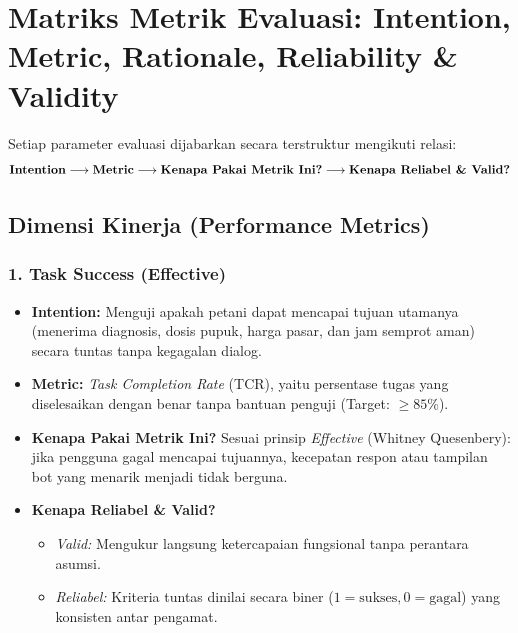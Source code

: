 \documentclass[11pt,a4paper]{article}
\begin{document}
\section{Matriks Metrik Evaluasi: Intention, Metric, Rationale, Reliability \& Validity}

Setiap parameter evaluasi dijabarkan secara terstruktur mengikuti relasi:
\begin{equation*}
    \text{\textbf{Intention}} \longrightarrow \text{\textbf{Metric}} \longrightarrow \text{\textbf{Kenapa Pakai Metrik Ini?}} \longrightarrow \text{\textbf{Kenapa Reliabel \& Valid?}}
\end{equation*}

\subsection{Dimensi Kinerja (Performance Metrics)}

\subsubsection{1. Task Success (Effective)}
\begin{itemize}[noitemsep]
    \item \textbf{Intention:} Menguji apakah petani dapat mencapai tujuan utamanya (menerima diagnosis, dosis pupuk, harga pasar, dan jam semprot aman) secara tuntas tanpa kegagalan dialog.
    \item \textbf{Metric:} \textit{Task Completion Rate} (TCR), yaitu persentase tugas yang diselesaikan dengan benar tanpa bantuan penguji (Target: $\ge 85\%$).
    \item \textbf{Kenapa Pakai Metrik Ini?} Sesuai prinsip \textit{Effective} (Whitney Quesenbery): jika pengguna gagal mencapai tujuannya, kecepatan respon atau tampilan bot yang menarik menjadi tidak berguna.
    \item \textbf{Kenapa Reliabel \& Valid?}
    \begin{itemize}[noitemsep]
        \item \textit{Valid:} Mengukur langsung ketercapaian fungsional tanpa perantara asumsi.
        \item \textit{Reliabel:} Kriteria tuntas dinilai secara biner ($1 = \text{sukses}, 0 = \text{gagal}$) yang konsisten antar pengamat.
    \end{itemize}
\end{itemize}
\end{document}
